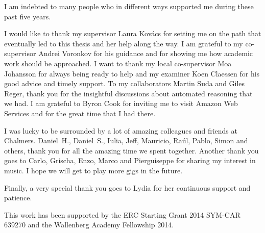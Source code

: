 I am indebted to many people who in different ways supported me during these past five years.

I would like to thank my supervisor Laura Kov\'acs for setting me on the path that eventually led to this thesis and her help along the way. I am grateful to my co-supervisor Andrei Voronkov for his guidance and for showing me how academic work should be approached. I want to thank my local co-supervisor Moa Johansson for always being ready to help and my examiner Koen Claessen for his good advice and timely support. To my collaborators Martin Suda and Giles Reger, thank you for the insightful discussions about automated reasoning that we had. I am grateful to Byron Cook for inviting me to visit Amazon Web Services and for the great time that I had there.

I was lucky to be surrounded by a lot of amazing colleagues and friends at Chalmers. Daniel~H., Daniel~S., Iulia, Jeff, Mauricio, Ra\'ul, Pablo, Simon and others, thank you for all the amazing time we spent together. Another thank you goes to Carlo, Grischa, Enzo, Marco and Pierguiseppe for sharing my interest in music. I hope we will get to play more gigs in the future.

Finally, a very special thank you goes to Lydia for her continuous support and patience.

\vfill

This work has been supported by the ERC Starting Grant 2014 SYM-CAR 639270 and the Wallenberg Academy Fellowship 2014.
